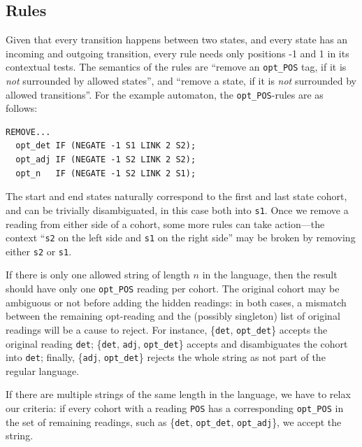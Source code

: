 \documentclass[11pt]{article}
\def\t#1{\texttt{#1}}
\begin{document}
\subsection{Rules}
Given that every transition happens between two states, and every state 
has an incoming and outgoing transition, every rule needs only
positions -1 and 1 in its contextual tests. 
The semantics of the rules are ``remove an \t{opt\_POS} tag, if it is 
\emph{not} surrounded by allowed states'',
and ``remove a state, if it is \emph{not} surrounded by allowed transitions''.
For the example automaton, the \t{opt\_POS}-rules are as follows:
\begin{verbatim}
REMOVE...
  opt_det IF (NEGATE -1 S1 LINK 2 S2);
  opt_adj IF (NEGATE -1 S2 LINK 2 S2);
  opt_n   IF (NEGATE -1 S2 LINK 2 S1);
\end{verbatim}
The start and end states naturally correspond to the first and last
state cohort, and can be trivially disambiguated, in this case both into \t{s1}.
Once we remove a reading from either side of a cohort, some more rules can take
action---the context ``\t{s2} on the left side and \t{s1} on the right side''
may be broken by removing either \t{s2} or \t{s1}. 

If there is only one allowed string of length $n$ in the language, then the
result should have only one \t{opt\_POS} reading per cohort. 
The original cohort may be ambiguous or not before adding the hidden readings:
in both cases, a mismatch between the remaining opt-reading and the (possibly singleton)
list of original readings will be a cause to reject.
For instance, \{\t{det}, \t{opt\_det}\} accepts the original reading \t{det};
\{\t{det}, \t{adj}, \t{opt\_det}\} accepts and disambiguates the cohort into
\t{det}; finally, \{\t{adj}, \t{opt\_det}\} rejects the whole string as not 
part of the regular language.

If there are multiple strings of the same length in the language, we have to
relax our criteria: if every cohort with a reading \t{POS} has a corresponding
\t{opt\_POS} in the set of remaining readings, such as \{\t{det}, \t{opt\_det},
\t{opt\_adj}\}, we accept the string. 

\end{document}
